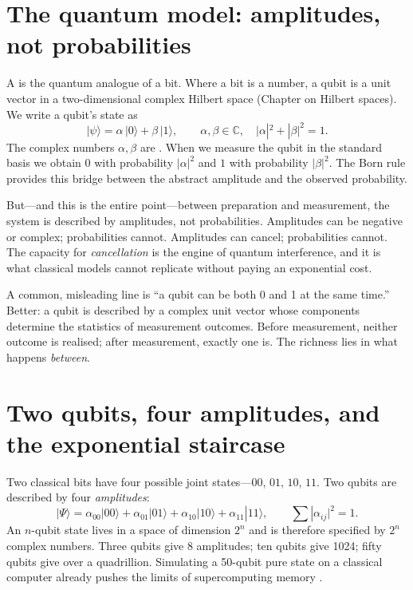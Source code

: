 \section{The quantum model: amplitudes, not probabilities}

A  is the quantum analogue of a bit. Where a bit is a number, a qubit is a unit vector in a two-dimensional complex Hilbert space (Chapter on Hilbert spaces). We write a qubit's state as
\[
  |\psi\rangle = \alpha\,|0\rangle + \beta\,|1\rangle, \qquad \alpha,\beta\in\mathbb{C}, \quad |\alpha|^2+|\beta|^2 = 1.
\]
The complex numbers $\alpha,\beta$ are . When we measure the qubit in the standard basis we obtain $0$ with probability $|\alpha|^2$ and $1$ with probability $|\beta|^2$. The Born rule \citep{born_zur_1926} provides this bridge between the abstract amplitude and the observed probability.

But---and this is the entire point---between preparation and measurement, the system is described by amplitudes, not probabilities. Amplitudes can be negative or complex; probabilities cannot. Amplitudes can cancel; probabilities cannot. The capacity for \emph{cancellation} is the engine of quantum interference, and it is what classical models cannot replicate without paying an exponential cost.

\begin{remark}
A common, misleading line is ``a qubit can be both 0 and 1 at the same time.'' Better: a qubit is described by a complex unit vector whose components determine the statistics of measurement outcomes. Before measurement, neither outcome is realised; after measurement, exactly one is. The richness lies in what happens \emph{between}.
\end{remark}

\section{Two qubits, four amplitudes, and the exponential staircase}

Two classical bits have four possible joint states---$00$, $01$, $10$, $11$. Two qubits are described by four \emph{amplitudes}:
\[
  |\Psi\rangle = \alpha_{00}|00\rangle + \alpha_{01}|01\rangle + \alpha_{10}|10\rangle + \alpha_{11}|11\rangle, \qquad \sum |\alpha_{ij}|^2 = 1.
\]
An $n$-qubit state lives in a space of dimension $2^n$ and is therefore specified by $2^n$ complex numbers. Three qubits give 8 amplitudes; ten qubits give 1024; fifty qubits give over a quadrillion. Simulating a 50-qubit pure state on a classical computer already pushes the limits of supercomputing memory \citep{arute_quantum_2019}.

